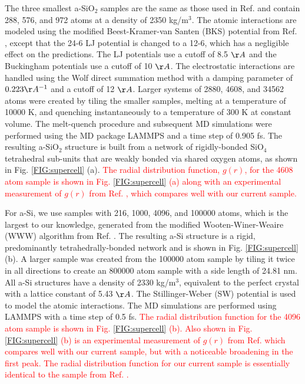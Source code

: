 \documentclass[aps,prb,onecolumn,preprint,superscriptaddress,footinbib,amsmath,amssymb,floatfix]{revtex4}
\begin{document}
The three smallest a-SiO$_2$ samples are the same as those used 
in Ref.  
and contain 288, 576, and 972 atoms at a density of 2350 kg/m$^3$. 
The atomic interactions are modeled using 
the modified Beest-Kramer-van Santen (BKS) potential
\cite{van_Beest_force_1990,kramer_interatomic_1991}
from Ref. 
, except that the 24-6 
LJ potential\cite{guissani_numerical_1996} 
is changed to a 12-6, 
which has a negligible effect on the predictions.  
The LJ potentials use a cutoff of 8.5 $\AA$ and the Buckingham 
potentials use a cutoff of 10 $\AA$. 
The electrostatic interactions are handled using the Wolf direct 
summation method with 
a damping parameter of $0.223 \AA^{-1}$ and a cutoff 
of 12 $\AA$.\cite{wolf_exact_1999} 
Larger systems of 2880, 4608, and 34562 atoms were created by 
tiling the smaller samples, melting at a temperature of 10000 K,  
and quenching instantaneously to a temperature of 300 K at 
constant volume. 
The melt-quench procedure and subsequent MD simulations were 
performed using the MD package 
LAMMPS and a time step of 0.905 fs.\cite{plimpton_fast_1995} 
The resulting a-SiO$_2$ structure is built from a network 
of rigidly-bonded SiO$_4$ tetrahedral sub-units that are weakly 
bonded via shared oxygen atoms, 
as shown in Fig. \ref{FIG:supercell} (a). 
\textcolor{red}{The radial distribution function, 
$g(r)$,\cite{mcquarrie_statistical_2000} for the 4608 atom 
sample is shown in Fig. \ref{FIG:supercell} (a) along with an 
experimental measurement of $g(r)$ from 
Ref. , which 
compares well with our current sample.}

For a-Si, we use samples 
with 216, 1000, 4096, and 100000 atoms, 
which is the largest to our knowledge, generated from the 
modified Wooten-Winer-Weaire (WWW) algorithm 
from Ref. . 
The resulting a-Si structure is a rigid, predominantly 
tetrahedrally-bonded network\cite{barkema_high-quality_2000} 
and is shown in Fig. \ref{FIG:supercell} (b).  
A larger sample was created from the 100000 atom sample 
by tiling it twice in all directions to create an 
800000 atom sample with a side length of 24.81 nm.  
All a-Si structures have a density of 2330 kg/m$^3$, 
equivalent to the perfect 
crystal with a lattice constant of 5.43 $\AA$. 
The Stillinger-Weber (SW) potential is used to model the atomic 
interactions.\cite{stillinger_computer_1985} The MD simulations 
are performed using LAMMPS with a time step of 0.5 fs. 
\textcolor{red}{The radial distribution function for the 4096 atom 
sample is shown in Fig. \ref{FIG:supercell} (b). 
Also shown in Fig. \ref{FIG:supercell} (b) is an experimental 
measurement of $g(r)$ from Ref.  
which compares well with our current sample, but with a noticeable 
broadening in the first peak. The radial distribution function 
for our current sample is essentially identical to the sample from 
Ref. .}
\end{document}
